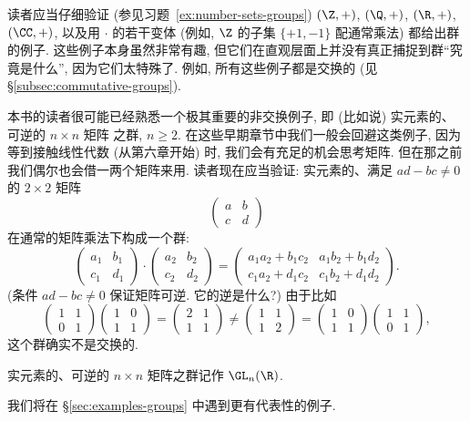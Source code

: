 \begin{example}
\label{ex:number-groups}
读者应当仔细验证 (参见习题~\ref{ex:number-sets-groups}) $(\Z, +)$, $(\Q, +)$, $(\R, +)$, $(\CC, +)$, 以及用 $\cdot$ 的若干变体 (例如, $\Z$ 的子集 $\{+1, -1\}$ 配通常乘法) 都给出群的例子. 这些例子本身虽然非常有趣, 但它们在直观层面上并没有真正捕捉到群``究竟是什么'', 因为它们太特殊了. 例如, 所有这些例子都是交换的 (见 \S\ref{subsec:commutative-groups}).
\end{example}

\begin{example}
\label{ex:GLn}
本书的读者很可能已经熟悉一个极其重要的非交换例子, 即 (比如说) 实元素的、可逆的 $n \times n$ 矩阵%
之群, $n \geq 2$. 在这些早期章节中我们一般会回避这类例子, 因为等到接触线性代数 (从第六章开始) 时, 我们会有充足的机会思考矩阵. 但在那之前我们偶尔也会借一两个矩阵来用. 读者现在应当验证: 实元素的、满足 $ad - bc \neq 0$ 的 $2 \times 2$ 矩阵
\[
\begin{pmatrix} a & b \\ c & d \end{pmatrix}
\]
在通常的矩阵乘法下构成一个群:
\[
\begin{pmatrix} a_1 & b_1 \\ c_1 & d_1 \end{pmatrix} \cdot \begin{pmatrix} a_2 & b_2 \\ c_2 & d_2 \end{pmatrix} = \begin{pmatrix} a_1 a_2 + b_1 c_2 & a_1 b_2 + b_1 d_2 \\ c_1 a_2 + d_1 c_2 & c_1 b_2 + d_1 d_2 \end{pmatrix}.
\]
(条件 $ad - bc \neq 0$ 保证矩阵可逆. 它的逆是什么?) 由于比如
\[
\begin{pmatrix} 1 & 1 \\ 0 & 1 \end{pmatrix} \begin{pmatrix} 1 & 0 \\ 1 & 1 \end{pmatrix} = \begin{pmatrix} 2 & 1 \\ 1 & 1 \end{pmatrix} \neq \begin{pmatrix} 1 & 1 \\ 1 & 2 \end{pmatrix} = \begin{pmatrix} 1 & 0 \\ 1 & 1 \end{pmatrix} \begin{pmatrix} 1 & 1 \\ 0 & 1 \end{pmatrix},
\]
这个群确实不是交换的.

实元素的、可逆的 $n \times n$ 矩阵之群记作 $\GL_n(\R)$.

我们将在 \S\ref{sec:examples-groups} 中遇到更有代表性的例子.
\end{example}

